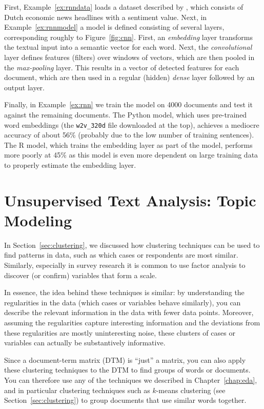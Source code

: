 First, Example~\ref{ex:rnndata} loads a dataset described by \citet{vanatteveldt20}, which consists of Dutch economic news headlines with a sentiment value.
Next, in Example~\ref{ex:rnnmodel} a model is defined consisting of several layers,
corresponding roughly to Figure~\ref{fig:cnn}.
First, an \emph{embedding} layer transforms the textual input into a semantic vector for each word.
Next, the \emph{convolutional} layer defines features (filters) over windows of vectors,
which are then pooled in the \emph{max-pooling} layer.
This results in a vector of detected features for each document,
which are then used in a regular (hidden) \emph{dense} layer followed by an output layer.

Finally, in Example~\ref{ex:rnn} we train the model on 4000 documents and test it against the remaining documents.
The Python model, which uses pre-trained word embeddings (the \texttt{w2v\_320d} file downloaded at the top),
achieves a mediocre accuracy of about 56\% (probably due to the low number of training sentences).
The R model, which trains the embedding layer as part of the model, performs more poorly at 45\% as this model is even more dependent on large training data to properly estimate the embedding layer.


%

\section{Unsupervised Text Analysis: Topic Modeling}
\label{sec:unsupervised}

In Section~\ref{sec:clustering}, we discussed how clustering techniques can be used to find patterns in data,
such as which cases or respondents are most similar.
Similarly, especially in survey research it is common to use factor analysis to discover (or confirm) variables that form a scale.

In essence, the idea behind these techniques is similar:
by understanding the regularities in the data (which cases or variables behave similarly),
you can describe the relevant information in the data with fewer data points.
Moreover, assuming the regularities capture interesting information and the deviations from these regularities are mostly
uninteresting noise, these clusters of cases or variables can actually be substantively informative.

Since a document-term matrix (DTM) is ``just'' a matrix, you can also apply these clustering techniques to the DTM
to find groups of words or documents. You can therefore use any of the techniques we described in Chapter~\ref{chap:eda}, and in particular clustering techniques such as $k$-means clustering (see  Section~\ref{sec:clustering}) to group documents that use similar words together.

